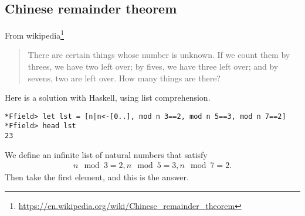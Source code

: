 \documentclass[11pt]{book}
\begin{document}
%  
%

\subsection{Chinese remainder theorem}
From wikipedia\footnote{
\url{https://en.wikipedia.org/wiki/Chinese_remainder_theorem}
}
\begin{quotation}
There are certain things whose number is unknown. If we count them by threes, we have two left over; by fives, we have three left over; and by sevens, two are left over. How many things are there? 
\end{quotation}
Here is a solution with Haskell, using list comprehension.
\begin{verbatim}
*Ffield> let lst = [n|n<-[0..], mod n 3==2, mod n 5==3, mod n 7==2]
*Ffield> head lst
23
\end{verbatim}
We define an infinite list of natural numbers that satisfy
\begin{eqnarray}
n \mod 3 = 2, n \mod 5 = 3, n \mod 7 = 2.
\end{eqnarray}
Then take the first element, and this is the answer.
\end{document}
